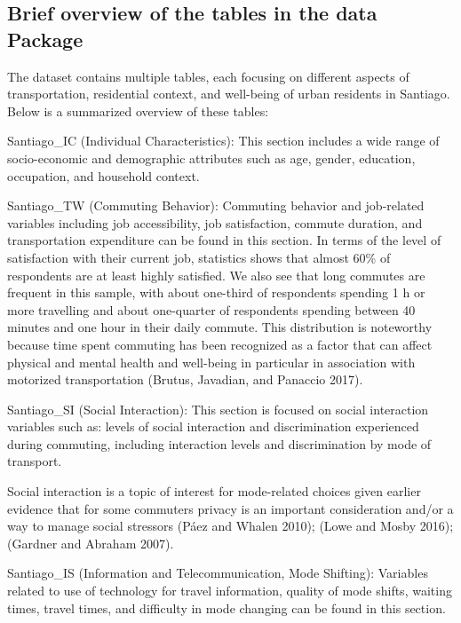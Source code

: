 \documentclass[
]{article}
\begin{document}
\hypertarget{brief-overview-of-the-tables-in-the-data-package}{%
\subsection{Brief overview of the tables in the data
Package}\label{brief-overview-of-the-tables-in-the-data-package}}

The dataset contains multiple tables, each focusing on different aspects
of transportation, residential context, and well-being of urban
residents in Santiago. Below is a summarized overview of these tables:

Santiago\_IC (Individual Characteristics): This section includes a wide
range of socio-economic and demographic attributes such as age, gender,
education, occupation, and household context.

Santiago\_TW (Commuting Behavior): Commuting behavior and job-related
variables including job accessibility, job satisfaction, commute
duration, and transportation expenditure can be found in this section.
In terms of the level of satisfaction with their current job, statistics
shows that almost 60\% of respondents are at least highly satisfied. We
also see that long commutes are frequent in this sample, with about
one-third of respondents spending 1 h or more travelling and about
one-quarter of respondents spending between 40 minutes and one hour in
their daily commute. This distribution is noteworthy because time spent
commuting has been recognized as a factor that can affect physical and
mental health and well-being in particular in association with motorized
transportation (Brutus, Javadian, and Panaccio 2017).

Santiago\_SI (Social Interaction): This section is focused on social
interaction variables such as: levels of social interaction and
discrimination experienced during commuting, including interaction
levels and discrimination by mode of transport.

Social interaction is a topic of interest for mode-related choices given
earlier evidence that for some commuters privacy is an important
consideration and/or a way to manage social stressors (Páez and Whalen
2010); (Lowe and Mosby 2016); (Gardner and Abraham 2007).

Santiago\_IS (Information and Telecommunication, Mode Shifting):
Variables related to use of technology for travel information, quality
of mode shifts, waiting times, travel times, and difficulty in mode
changing can be found in this section.
\end{document}
